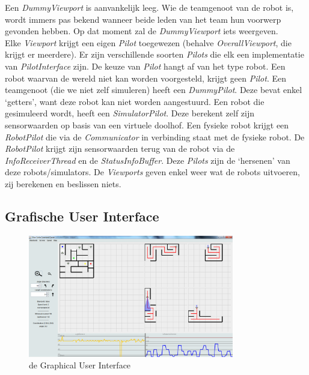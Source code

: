 \documentclass[tt2]{penoverslag}
\begin{document}
Een \textit{DummyViewport} is aanvankelijk leeg. Wie de teamgenoot van de robot is, wordt immers pas bekend wanneer beide leden van het team hun voorwerp gevonden hebben. Op dat moment zal de \textit{DummyViewport} iets weergeven.\\

Elke \textit{Viewport} krijgt een eigen \textit{Pilot} toegewezen (behalve \textit{OverallViewport}, die krijgt er meerdere). Er zijn verschillende soorten \textit{Pilots} die elk een implementatie van \textit{PilotInterface} zijn. De keuze van \textit{Pilot} hangt af van het type robot. Een robot waarvan de wereld niet kan worden voorgesteld, krijgt geen \textit{Pilot}. Een teamgenoot (die we niet zelf simuleren) heeft een \textit{DummyPilot}. Deze bevat enkel `getters', want deze robot kan niet worden aangestuurd. Een robot die gesimuleerd wordt, heeft een \textit{SimulatorPilot}. Deze berekent zelf zijn sensorwaarden op basis van een virtuele doolhof. Een fysieke robot krijgt een \textit{RobotPilot} die via de \textit{Communicator} in verbinding staat met de fysieke robot. De \textit{RobotPilot} krijgt zijn sensorwaarden terug van de robot via de \textit{InfoReceiverThread} en de \textit{StatusInfoBuffer}. Deze \textit{Pilots} zijn de `hersenen' van deze robots/simulators. De \textit{Viewports} geven enkel weer wat de robots uitvoeren, zij berekenen en beslissen niets.

\subsection{Grafische User Interface}
\label{ssec:GUI}

\begin{figure}[h]
\centering
	\includegraphics[width=0.8\textwidth]{GUInew}
\caption{de Graphical User Interface}
\label{fig:GUI}
\end{figure}
\end{document}
